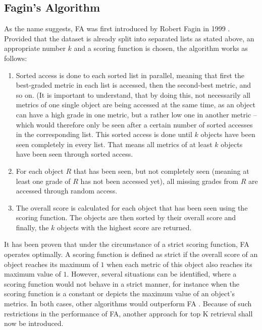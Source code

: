\subsection{Fagin's Algorithm}

As the name suggests, FA was first introduced by Robert Fagin in 1999 \cite{fagin1999}. Provided that the dataset is already split into separated lists as stated above, an appropriate number $k$ and a scoring function is chosen, the algorithm works as follows:

\begin{enumerate}

\item Sorted access is done to each sorted list in parallel, meaning that first the best-graded metric in each list is accessed, then the second-best metric, and so on. (It is important to understand, that by doing this, not necessarily all metrics of one single object are being accessed at the same time, as an object can have a high grade in one metric, but a rather low one in another metric – which would therefore only be seen after a certain number of sorted accesses in the corresponding list. This sorted access is done until $k$ objects have been seen completely in every list. That means all metrics of at least $k$ objects have been seen through sorted access. 

\item For each object $R$ that has been seen, but not completely seen (meaning at least one grade of $R$ has not been accessed yet), all missing grades from $R$ are accessed through random access. 

\item The overall score is calculated for each object that has been seen using the scoring function. The objects are then sorted by their overall score and finally, the $k$ objects with the highest score are returned. 

\end{enumerate}

It has been proven that under the circumstance of a strict scoring function, FA operates optimally. A scoring function is defined as strict if the overall score of an object reaches its maximum of $1$ when each metric of this object also reaches its maximum value of $1$. However, several situations can be identified, where a scoring function would not behave in a strict manner, for instance when the scoring function is a constant or depicts the maximum value of an object’s metrics. In both cases, other algorithms would outperform FA \cite{fagin2002}. Because of such restrictions in the performance of FA, another approach for top K retrieval shall now be introduced.


